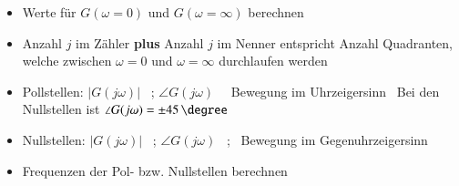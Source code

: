 \begin{itemize}
    \item Werte für $G(\omega = 0)$ und $G(\omega = \infty)$ berechnen
    \item Anzahl $j$ im Zähler \textbf{plus} Anzahl $j$ im Nenner entspricht Anzahl Quadranten, welche zwischen $\omega = 0$ und 
        $\omega = \infty$ durchlaufen werden
    \item Pollstellen: $|G(j \omega)|$ \textdownarrow\ ; $\angle G(j \omega)$ \textdownarrow\ \textrightarrow\ Bewegung im Uhrzeigersinn
        \textrightarrow\ Bei den Nullstellen ist $\angle G(j \omega) = \pm 45 \, \degree$
    \item Nullstellen: $|G(j \omega)|$ \textuparrow\ ; $\angle G(j \omega)$ \textuparrow\ ; \textrightarrow\ Bewegung im Gegenuhrzeigersinn
    \item Frequenzen der Pol- bzw. Nullstellen berechnen
\end{itemize}